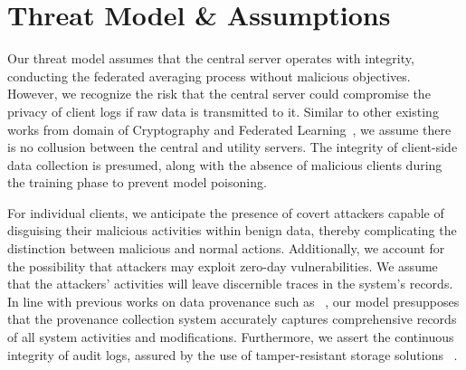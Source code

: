 
\section{Threat Model \& Assumptions}

Our threat model assumes that the central server operates with integrity, conducting the federated averaging process without malicious objectives. However, we recognize the risk that the central server could compromise the privacy of client logs if raw data is transmitted to it. Similar to other existing works from domain of Cryptography and Federated Learning~\cite{roy2020crypte,wu2022federated}, we assume there is no collusion between the central and utility servers. The integrity of client-side data collection is presumed, along with the absence of malicious clients during the training phase to prevent model poisoning.

For individual clients, we anticipate the presence of covert attackers capable of disguising their malicious activities within benign data, thereby complicating the distinction between malicious and normal actions. Additionally, we account for the possibility that attackers may exploit zero-day vulnerabilities. We assume that the attackers' activities will leave discernible traces in the system's records. In line with previous works on data provenance such as ~\cite{nodoze2019, priotracker2018, mzx2016, bates2017transparent}, our model presupposes that the provenance collection system accurately captures comprehensive records of all system activities and modifications. Furthermore, we assert the continuous integrity of audit logs, assured by the use of tamper-resistant storage solutions ~\cite{paccagnella2020custos, hardlog}.